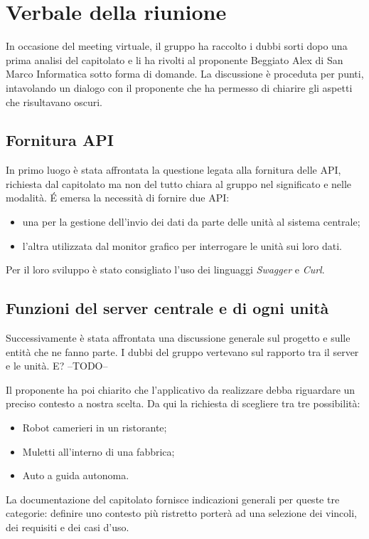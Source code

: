 \section{Verbale della riunione}

In occasione del meeting virtuale, il gruppo ha raccolto i dubbi sorti dopo una prima analisi del capitolato e li ha rivolti al proponente Beggiato Alex di San Marco Informatica sotto forma di domande. La discussione è proceduta per punti, intavolando un dialogo con il proponente che ha permesso di chiarire gli aspetti che risultavano oscuri.


\subsection{Fornitura API}
In primo luogo è stata affrontata la questione legata alla fornitura delle API, richiesta dal capitolato ma non del tutto chiara al gruppo nel significato e nelle modalità. \'E emersa la necessità di fornire due API:
\begin{itemize}
	\item una per la gestione dell'invio dei dati da parte delle unità al sistema centrale;
	\item l'altra utilizzata dal monitor grafico per interrogare le unità sui loro dati.
\end{itemize}
Per il loro sviluppo è stato consigliato l'uso dei linguaggi \textit{Swagger} e \textit{Curl}.

\subsection{Funzioni del server centrale e di ogni unità}
Successivamente è stata affrontata una discussione generale sul progetto e sulle entità che ne fanno parte. I dubbi del gruppo vertevano sul rapporto tra il server e le unità. E? --TODO-- 

Il proponente ha poi chiarito che l'applicativo da realizzare debba riguardare un preciso contesto a nostra scelta. Da qui la richiesta di scegliere tra tre possibilità:
\begin{itemize}
	\item Robot camerieri in un ristorante;
	\item Muletti all'interno di una fabbrica;
	\item Auto a guida autonoma.
\end{itemize}
La documentazione del capitolato fornisce indicazioni generali per queste tre categorie: definire uno contesto più ristretto porterà ad una selezione dei vincoli, dei requisiti e dei casi d'uso.

